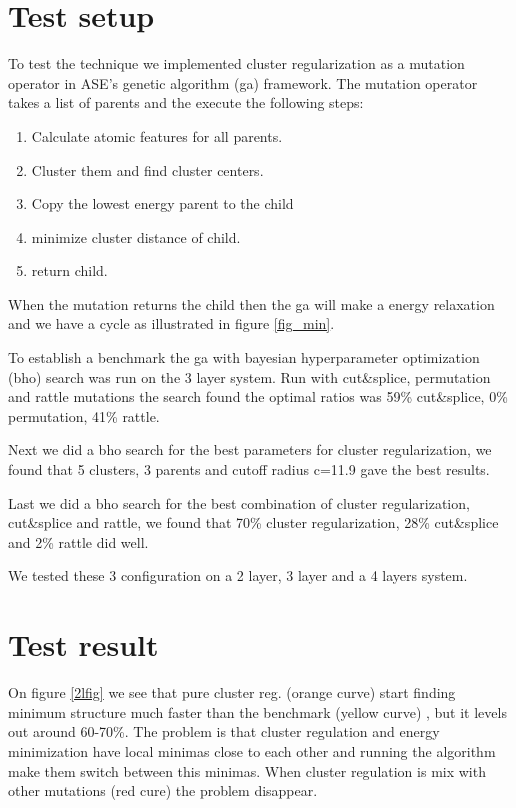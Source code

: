 \documentclass[%
 aps,
 prl,%
 amsmath,amssymb,
 reprint,%
]{revtex4-1}
\begin{document}
\section{Test setup}

To test the technique we implemented cluster regularization as a mutation operator in ASE's genetic algorithm (ga)\cite{ase_ga} framework. 
The mutation operator takes a list of parents and the execute the following steps:
\begin{enumerate}
\item Calculate atomic features for all parents.
\item Cluster them and find cluster centers.
\item Copy the lowest energy parent to the child
\item minimize cluster distance of child.
\item return child.
\end{enumerate}
When the mutation returns the child then the ga will make a energy relaxation 
and we have a cycle as illustrated in figure \ref{fig_min}.

To establish a benchmark the ga with bayesian hyperparameter optimization (bho) search was run on the 3 layer system.
Run with cut\&splice, permutation and rattle mutations the search found the optimal ratios was 59\% cut\&splice, 0\% permutation, 41\% rattle. 

Next we did a bho search for the best parameters for cluster regularization, we found that 5 clusters, 3 parents and cutoff radius c=11.9 gave the best results.

Last we did a bho search for the best combination of cluster regularization, cut\&splice and rattle, we found that 70\% cluster regularization, 28\% cut\&splice and 2\% rattle did well.

We tested these 3 configuration on a 2 layer, 3 layer and a 4 layers system. 

\section{Test result}

On figure \ref{2lfig} we see that pure cluster reg. (orange curve) start finding minimum structure much faster than the benchmark (yellow curve) , but it levels out around 60-70\%. The problem is that cluster regulation and energy minimization have local minimas close to each other and running the algorithm make them switch between this minimas. When cluster regulation is mix with other mutations (red cure) the problem disappear. 
\end{document}
